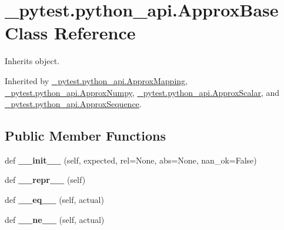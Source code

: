 \hypertarget{class__pytest_1_1python__api_1_1_approx_base}{}\section{\+\_\+pytest.\+python\+\_\+api.\+Approx\+Base Class Reference}
\label{class__pytest_1_1python__api_1_1_approx_base}


Inherits object.



Inherited by \hyperlink{class__pytest_1_1python__api_1_1_approx_mapping}{\+\_\+pytest.\+python\+\_\+api.\+Approx\+Mapping}, \hyperlink{class__pytest_1_1python__api_1_1_approx_numpy}{\+\_\+pytest.\+python\+\_\+api.\+Approx\+Numpy}, \hyperlink{class__pytest_1_1python__api_1_1_approx_scalar}{\+\_\+pytest.\+python\+\_\+api.\+Approx\+Scalar}, and \hyperlink{class__pytest_1_1python__api_1_1_approx_sequence}{\+\_\+pytest.\+python\+\_\+api.\+Approx\+Sequence}.

\subsection*{Public Member Functions}
\begin{DoxyCompactItemize}
\item 
\mbox{\label{class__pytest_1_1python__api_1_1_approx_base_a8d710c64782640d41bbfbba4e844bf28}} 
def {\bfseries \+\_\+\+\_\+init\+\_\+\+\_\+} (self, expected, rel=None, abs=None, nan\+\_\+ok=False)
\item 
\mbox{\label{class__pytest_1_1python__api_1_1_approx_base_a6b36a0f8d8f2b915e2fce255dc82e6f5}} 
def {\bfseries \+\_\+\+\_\+repr\+\_\+\+\_\+} (self)
\item 
\mbox{\label{class__pytest_1_1python__api_1_1_approx_base_a400f68e4aab8e74a73d4c23a32d77404}} 
def {\bfseries \+\_\+\+\_\+eq\+\_\+\+\_\+} (self, actual)
\item 
\mbox{\label{class__pytest_1_1python__api_1_1_approx_base_af0fdfa2bce1a0124deb375be7c58eab4}} 
def {\bfseries \+\_\+\+\_\+ne\+\_\+\+\_\+} (self, actual)
\end{DoxyCompactItemize}
